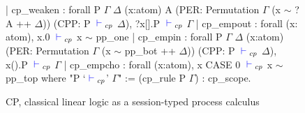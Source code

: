 \begin{figure}
\begin{coq}
  | cp_weaken : forall P $\Gamma$ $\Delta$ (x:atom) A
                  (PER: Permutation $\Gamma$ (x $\sim$ ? A ++ $\Delta$))
                  (CPP: P ${\color{blue} {} \vdash {}}_{cp}$ $\Delta$),
                ?x[].P ${\color{blue} {} \vdash {}}_{cp}$ $\Gamma$
  | cp_empout : forall (x: atom), x.0 ${\color{blue} {} \vdash {}}_{cp}$ x $\sim$ pp_one
  | cp_empin : forall P $\Gamma$ $\Delta$ (x:atom)
                 (PER: Permutation $\Gamma$ (x $\sim$ pp_bot ++ $\Delta$))
                 (CPP: P ${\color{blue} {} \vdash {}}_{cp}$ $\Delta$),
               x().P ${\color{blue} {} \vdash {}}_{cp}$ $\Gamma$
  | cp_empcho : forall (x:atom), x CASE 0 ${\color{blue} {} \vdash {}}_{cp}$ x $\sim$ pp_top
where "P `${\color{blue} {} \vdash {}}_{cp}$' $\Gamma$" := (cp_rule P $\Gamma$) : cp_scope.
\end{coq}
\caption{CP, classical linear logic as a session-typed process calculus}
\label{fig:cll}
\end{figure}
